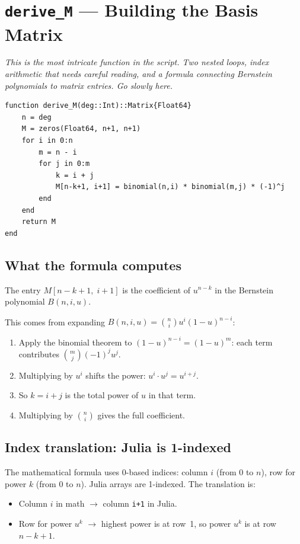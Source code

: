 \documentclass[12pt, a4paper]{article}
\newcommand{\cd}[1]{\texttt{#1}}
\begin{document}
\section{\texttt{derive\_M} --- Building the Basis Matrix}

\textit{This is the most intricate function in the script.
Two nested loops, index arithmetic that needs careful reading,
and a formula connecting Bernstein polynomials to matrix entries.
Go slowly here.}

\begin{verbatim}
function derive_M(deg::Int)::Matrix{Float64}
    n = deg
    M = zeros(Float64, n+1, n+1)
    for i in 0:n
        m = n - i
        for j in 0:m
            k = i + j
            M[n-k+1, i+1] = binomial(n,i) * binomial(m,j) * (-1)^j
        end
    end
    return M
end
\end{verbatim}

\subsection{What the formula computes}

The entry $M[n-k+1,\; i+1]$ is the coefficient of $u^{n-k}$
in the Bernstein polynomial $B(n, i, u)$.

This comes from expanding $B(n,i,u) = \binom{n}{i} u^i (1-u)^{n-i}$:
\begin{enumerate}
  \item Apply the binomial theorem to $(1-u)^{n-i} = (1-u)^m$:
        each term contributes $\binom{m}{j}(-1)^j u^j$.
  \item Multiplying by $u^i$ shifts the power: $u^i \cdot u^j = u^{i+j}$.
  \item So $k = i + j$ is the total power of $u$ in that term.
  \item Multiplying by $\binom{n}{i}$ gives the full coefficient.
\end{enumerate}

\subsection{Index translation: Julia is 1-indexed}

The mathematical formula uses 0-based indices:
column $i$ (from 0 to $n$), row for power $k$ (from 0 to $n$).
Julia arrays are 1-indexed.
The translation is:
\begin{itemize}
  \item Column $i$ in math $\to$ column \cd{i+1} in Julia.
  \item Row for power $u^k$ $\to$ highest power is at row~1,
        so power $u^k$ is at row $n - k + 1$.
\end{itemize}
\end{document}
